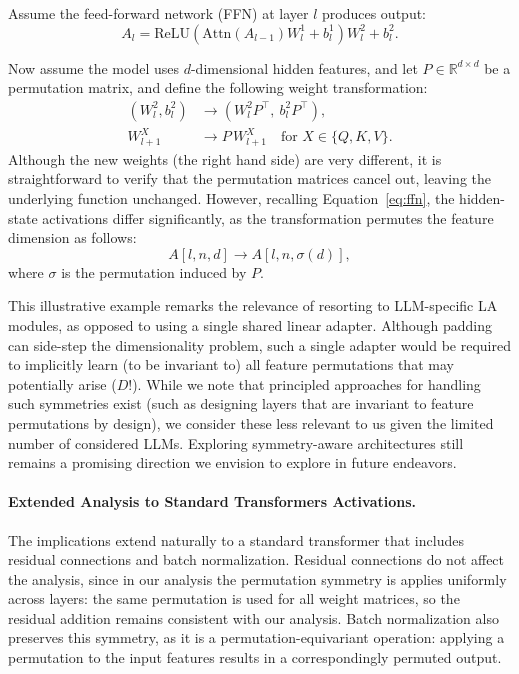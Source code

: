 Assume the feed-forward network (FFN) at layer $l$ produces output:
\begin{equation}
A_l = \mathrm{ReLU}(\mathrm{Attn}(A_{l-1}) W_l^1 + b_l^1) W_l^2 + b_l^2.
\label{eq:ffn}
\end{equation}

Now assume the model uses $d$-dimensional hidden features, and let $P \in \mathbb{R}^{d \times d}$ be a permutation
matrix, and define the following weight transformation:
\begin{align}
(W_l^2, b_l^2) &\to (W_l^2 P^\top,\ b_l^2 P^\top), \\
W_{l+1}^{X} &\to P\, W_{l+1}^{X} \quad \text{for } X \in \{Q, K, V\}.
\end{align}
Although the new weights (the right hand side) are very different, it is straightforward to verify that
the permutation matrices cancel out, leaving the underlying function unchanged. However, recalling
Equation~\eqref{eq:ffn}, the hidden-state activations differ significantly, as the transformation permutes the feature
dimension as follows:
\begin{equation}
A[l, n, d] \to A[l, n, \sigma(d)],
\end{equation}
where $\sigma$ is the permutation induced by $P$.

This illustrative example remarks the relevance of resorting to LLM-specific LA modules, as opposed to using a single shared linear adapter. Although padding can side-step the dimensionality
problem, such a single adapter would be required to implicitly learn (to be invariant to) all feature
permutations that may potentially arise ($D!$). While we note that principled approaches for handling
such symmetries exist (such as designing layers that are invariant to feature permutations by design),
we consider these less relevant to us given the limited number of considered LLMs. Exploring
symmetry-aware architectures still remains a promising direction we envision to explore in future
endeavors.

\paragraph{Extended Analysis to Standard Transformers Activations.} The implications extend naturally
to a standard transformer that includes residual connections and batch normalization. Residual
connections do not affect the analysis, since in our analysis the permutation symmetry is applies
uniformly across layers: the same permutation is used for all weight matrices, so the residual
addition remains consistent with our analysis. Batch normalization also preserves this symmetry, as
it is a permutation-equivariant operation: applying a permutation to the input features results in a
correspondingly permuted output.

